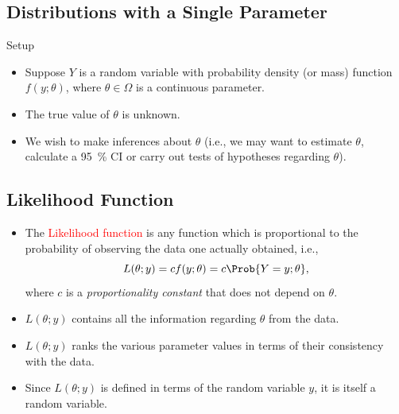 \documentclass{article}\usepackage[]{graphicx}\usepackage[svgnames]{xcolor}
\begin{document}
\subsection*{Distributions with a Single Parameter}
\begin{Regular}{Setup}
      \begin{itemize}
            \item Suppose $ Y $ is a random variable with probability density (or mass) function
                  $ f(y;\theta) $, where $ \theta\in\Omega $ is a continuous parameter.
            \item The true value of $ \theta $ is unknown.
            \item We wish to make inferences about $ \theta $ (i.e., we may want to estimate $ \theta $, calculate
                  a \qty{95}{\percent} CI or carry out tests of hypotheses regarding $ \theta $).
      \end{itemize}
\end{Regular}
\subsection*{Likelihood Function}
\begin{itemize}
      \item The \textcolor{Red}{Likelihood function} is any function which is proportional to the probability
            of observing the data one actually obtained, i.e.,
            \[ L(\theta;y)=cf(y;\theta)=c\Prob{Y=y;\theta}, \]
            where $ c $ is a \emph{proportionality constant} that does not depend on $ \theta $.
      \item $ L(\theta;y) $ contains all the information regarding $ \theta $ from the data.
      \item $ L(\theta;y) $ ranks the various parameter values in terms of their consistency
            with the data.
      \item Since $ L(\theta;y) $ is defined in terms of the random variable $ y $, it is itself a
            random variable.
\end{itemize}
\end{document}
